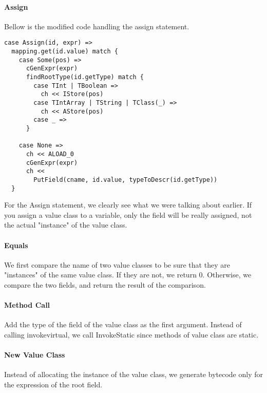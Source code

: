 \paragraph{Assign}
Bellow is the modified code handling the assign statement.
\begin{verbatim}
case Assign(id, expr) =>
  mapping.get(id.value) match {
    case Some(pos) =>
      cGenExpr(expr)
      findRootType(id.getType) match {
        case TInt | TBoolean => 
          ch << IStore(pos)
        case TIntArray | TString | TClass(_) => 
          ch << AStore(pos)
        case _ =>
      }

    case None =>
      ch << ALOAD_0
      cGenExpr(expr)
      ch << 
        PutField(cname, id.value, typeToDescr(id.getType))
  }
\end{verbatim}
For the Assign statement, we clearly see what we were talking about earlier. 
If you assign a value class to a variable, only the field will be really assigned, not the actual "instance" of the value class.

\paragraph{Equals}
We first compare the name of two value classes to be sure that they are "instances" of the same value class. If they are not, we return 0. Otherwise, we compare the two fields, and return the result of the comparison.

\paragraph{Method Call}
Add the type of the field of the value class as the first argument.
Instead of calling invokevirtual, we call InvokeStatic since methods of value class are static.

\paragraph{New Value Class}
Instead of allocating the instance of the value class, we generate bytecode only for the expression of the root field.
\newpage